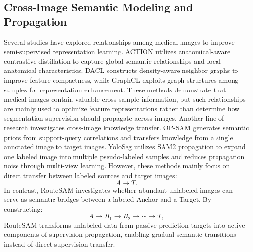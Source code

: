 \documentclass[a4paper,fleqn]{cas-dc}
\begin{document}
\subsection{Cross-Image Semantic Modeling and Propagation}

Several studies have explored relationships among medical images to improve semi-supervised representation learning. ACTION utilizes anatomical-aware contrastive distillation to capture global semantic relationships and local anatomical characteristics. DACL constructs density-aware neighbor graphs to improve feature compactness, while GraphCL exploits graph structures among samples for representation enhancement. These methods demonstrate that medical images contain valuable cross-sample information, but such relationships are mainly used to optimize feature representations rather than determine how segmentation supervision should propagate across images.
Another line of research investigates cross-image knowledge transfer. OP-SAM generates semantic priors from support-query correlations and transfers knowledge from a single annotated image to target images. YoloSeg utilizes SAM2 propagation to expand one labeled image into multiple pseudo-labeled samples and reduces propagation noise through multi-view learning. However, these methods mainly focus on direct transfer between labeled sources and target images:
\begin{equation}
A \rightarrow T .
\end{equation}
In contrast, RouteSAM investigates whether abundant unlabeled images can serve as semantic bridges between a labeled Anchor and a Target. By constructing:
\begin{equation}
A \rightarrow B_1 \rightarrow B_2 \rightarrow \cdots \rightarrow T ,
\end{equation}
RouteSAM transforms unlabeled data from passive prediction targets into active components of supervision propagation, enabling gradual semantic transitions instead of direct supervision transfer.



\section{}\label{}

\printcredits

%





\end{document}
